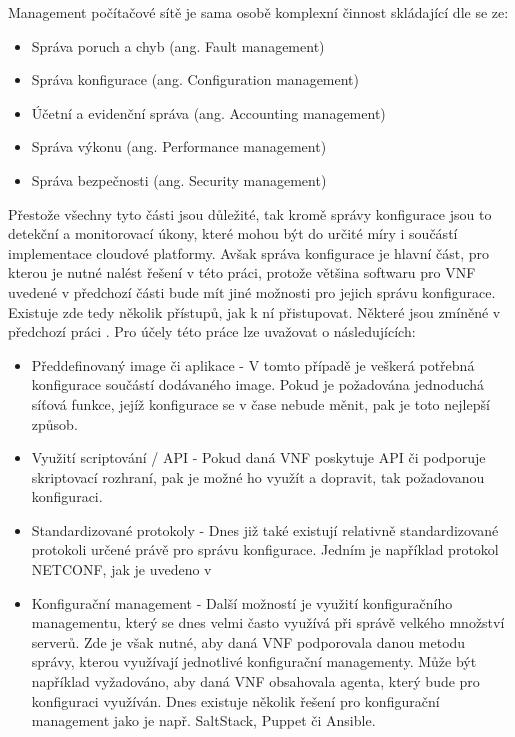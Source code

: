 Management počítačové sítě je sama osobě komplexní činnost skládající dle \cite{network_management} se ze:

\begin{itemize}
\item Správa poruch a chyb (ang. Fault management)
\item Správa konfigurace (ang. Configuration management)
\item Účetní a evidenční správa (ang. Accounting management)
\item Správa výkonu (ang. Performance management) 
\item Správa bezpečnosti (ang. Security management)
\end{itemize}

Přestože všechny tyto části jsou důležité, tak kromě správy konfigurace jsou to detekční a monitorovací úkony, které mohou být do určité míry i součástí implementace cloudové platformy. Avšak správa konfigurace je hlavní část, pro kterou je nutné nalést řešení v této práci, protože většina softwaru pro VNF uvedené v předchozí části bude mít jiné možnosti pro jejich správu konfigurace. Existuje zde tedy několik přístupů, jak k ní přistupovat. Některé jsou zmíněné v předchozí práci \cite{bakalarka}. Pro účely této práce lze uvažovat o následujících:

\begin{itemize}
\item Předdefinovaný image či aplikace - V tomto případě je veškerá potřebná konfigurace součástí dodávaného image. Pokud je požadována jednoduchá síťová funkce, jejíž konfigurace se v čase nebude měnit, pak je toto nejlepší způsob.
\item Využití scriptování / API - Pokud daná VNF poskytuje API či podporuje skriptovací rozhraní, pak je možné ho využít a dopravit, tak požadovanou konfiguraci.
\item Standardizované protokoly - Dnes již také existují relativně standardizované protokoli určené právě pro správu konfigurace. Jedním je například protokol NETCONF, jak je uvedeno v \cite{network_management}
\item Konfigurační management - Další možností je využití konfiguračního managementu, který se dnes velmi často využívá při správě velkého množství serverů. Zde je však nutné, aby daná VNF podporovala danou metodu správy, kterou využívají jednotlivé konfigurační managementy. Může být například vyžadováno, aby daná VNF obsahovala agenta, který bude pro konfiguraci využíván. Dnes existuje několik řešení pro konfigurační management jako je např. SaltStack, Puppet či Ansible.
\end{itemize}





